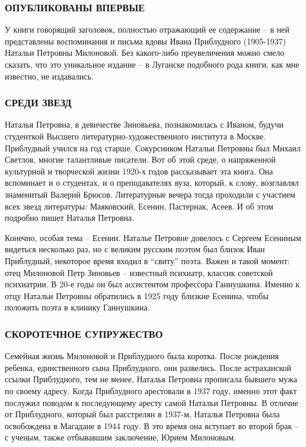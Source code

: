 \subsubsection{ОПУБЛИКОВАНЫ ВПЕРВЫЕ}

У книги говорящий заголовок, полностью отражающий ее содержание – в ней
представлены воспоминания и письма вдовы Ивана Приблудного (1905-1937) Натальи
Петровны Милоновой. Без какого-либо преувеличения можно смело сказать, что это
уникальное издание – в Луганске подобного рода книги, как мне известно, не
издавались.

\subsubsection{СРЕДИ ЗВЕЗД}

Наталья Петровна, в девичестве Зиновьева, познакомилась с Иваном, будучи
студенткой Высшего литературно-художественного института в Москве. Приблудный
учился на год старше. Сокурсником Натальи Петровны был Михаил Светлов, многие
талантливые писатели. Вот об этой среде, о напряженной культурной и творческой
жизни 1920-х годов рассказывает эта книга. Она вспоминает и о студентах, и о
преподавателях вуза, который, к слову, возглавлял знаменитый Валерий Брюсов.
Литературные вечера тогда проходили с участием всех звезд литературы:
Маяковский, Есенин, Пастернак, Асеев. И об этом подробно пишет Наталья
Петровна.

Конечно, особая тема – Есенин. Наталье Петровне довелось с Сергеем Есениным
видеться несколько раз, но с великим русским поэтом был близок Иван Приблудный,
некоторое время входил в \enquote{свиту} поэта. Важен и такой момент: отец Милоновой
Петр Зиновьев – известный психиатр, классик советской психиатрии. В 20-е годы
он был ассистентом профессора Ганнушкина. Именно к отцу Натальи Петровны
обратились в 1925 году близкие Есенина, чтобы положить поэта в клинику
Ганнушкина.

\subsubsection{СКОРОТЕЧНОЕ СУПРУЖЕСТВО}

Семейная жизнь Милоновой и Приблудного была коротка. После рождения ребенка,
единственного сына Приблудного, они развелись. После астраханской ссылки
Приблудного, тем не менее, Наталья Петровна прописала бывшего мужа по своему
адресу. Когда Приблудного арестовали в 1937 году, именно этот факт послужил
поводом к последующему аресту самой Натальи Петровны. В отличие от Приблудного,
который был расстрелян в 1937-м, Наталья Петровна была освобождена в Магадане в
1944 году. В это время она вступает во второй брак – с ученым, также отбывавшим
заключение, Юрием Милоновым.

